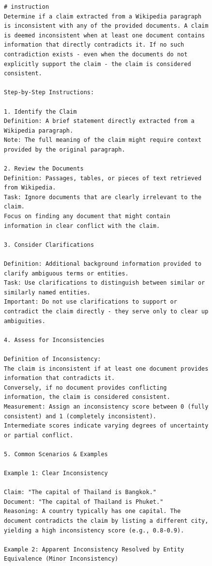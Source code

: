\begin{figure}[htb]
\begin{lstlisting}
# instruction
Determine if a claim extracted from a Wikipedia paragraph is inconsistent with any of the provided documents. A claim is deemed inconsistent when at least one document contains information that directly contradicts it. If no such contradiction exists - even when the documents do not explicitly support the claim - the claim is considered consistent.

Step-by-Step Instructions:

1. Identify the Claim
Definition: A brief statement directly extracted from a Wikipedia paragraph.
Note: The full meaning of the claim might require context provided by the original paragraph.

2. Review the Documents
Definition: Passages, tables, or pieces of text retrieved from Wikipedia.
Task: Ignore documents that are clearly irrelevant to the claim.
Focus on finding any document that might contain information in clear conflict with the claim.

3. Consider Clarifications

Definition: Additional background information provided to clarify ambiguous terms or entities.
Task: Use clarifications to distinguish between similar or similarly named entities.
Important: Do not use clarifications to support or contradict the claim directly - they serve only to clear up ambiguities.

4. Assess for Inconsistencies

Definition of Inconsistency:
The claim is inconsistent if at least one document provides information that contradicts it.
Conversely, if no document provides conflicting information, the claim is considered consistent.
Measurement: Assign an inconsistency score between 0 (fully consistent) and 1 (completely inconsistent).
Intermediate scores indicate varying degrees of uncertainty or partial conflict.

5. Common Scenarios & Examples

Example 1: Clear Inconsistency

Claim: "The capital of Thailand is Bangkok."
Document: "The capital of Thailand is Phuket."
Reasoning: A country typically has one capital. The document contradicts the claim by listing a different city, yielding a high inconsistency score (e.g., 0.8-0.9).

Example 2: Apparent Inconsistency Resolved by Entity Equivalence (Minor Inconsistency)


\end{lstlisting}
\end{figure}
